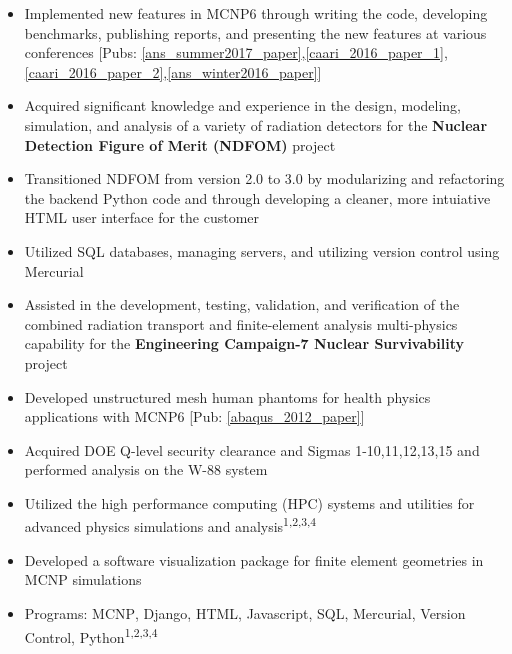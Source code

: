 \begin{minipage}{\textwidth}
    \begin{center}
	\begin{itemize}
	    \item Implemented new features in \textsc{MCNP6} through writing the code, developing benchmarks, publishing reports, and presenting the new features at various conferences [Pubs: \ref{ans_summer2017_paper},\ref{caari_2016_paper_1},\ref{caari_2016_paper_2},\ref{ans_winter2016_paper}]\none 
	    \item Acquired significant knowledge and experience in the design, modeling, simulation, and analysis of a variety of radiation detectors for the \textbf{Nuclear Detection Figure of Merit (NDFOM)} project\ntwo
	    \item Transitioned NDFOM from version 2.0 to 3.0 by modularizing and refactoring the backend Python code and through developing a cleaner, more intuiative HTML user interface for the customer\ntwo
            \item Utilized SQL databases, managing servers, and utilizing version control using Mercurial\none
	    \item Assisted in the development, testing, validation, and verification of the combined 
			radiation transport and finite-element analysis multi-physics capability for the \textbf{Engineering Campaign-7 Nuclear Survivability} project\nthree
	    \item Developed unstructured mesh human phantoms for health physics applications with \textsc{MCNP6} [Pub: \ref{abaqus_2012_paper}]\nthree
	    \item Acquired DOE Q-level security clearance and Sigmas 1-10,11,12,13,15 and performed analysis on the W-88 system\nthree
	    \item Utilized the high performance computing (HPC) systems and utilities for advanced physics simulations and analysis\textsuperscript{1,2,3,4}
	    \item Developed a software visualization package for finite element geometries in MCNP simulations\nfour
	    \item Programs: \textsc{MCNP}, Django, HTML, Javascript, SQL, Mercurial, Version Control, Python\textsuperscript{1,2,3,4}

\end{itemize}
\end{center}
\end{minipage}
